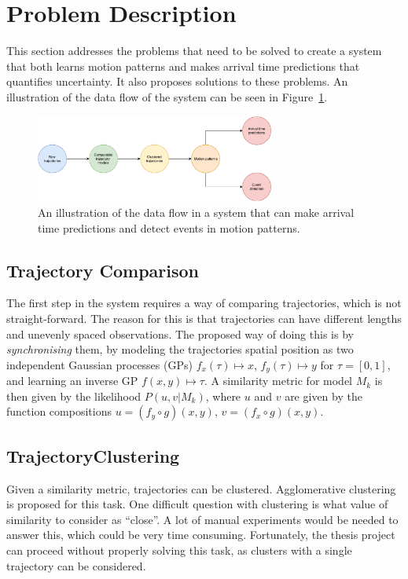\section{Problem Description}
This section addresses the problems that need to be solved to create a
system that both learns motion patterns and makes arrival
time predictions that quantifies uncertainty. It also proposes
solutions to these problems. An illustration of the data flow of the
system can be seen in Figure~\ref{fig:system-subproblems}.
\begin{figure}[H]
  \centering
  \includegraphics[width=0.7\textwidth]{figures/system-subproblems}
  \caption{An illustration of the data flow in a system that can make
    arrival time predictions and detect events in motion patterns.}\label{fig:system-subproblems}
\end{figure}

\subsection{Trajectory Comparison}
The first step in the system requires a way of comparing
trajectories, which is not straight-forward. The reason for this is that trajectories
can have different lengths and unevenly spaced observations.
The proposed way of doing this is by \textit{synchronising} them,
by modeling the trajectories spatial position as two independent
Gaussian processes (GPs) \(f_x(\tau) \mapsto
x\), \(f_y(\tau) \mapsto y\) for $\tau = [0,1]$, and learning an
inverse GP \(f(x, y) \mapsto \tau\). A similarity
metric for model \(M_k\) is then given by the likelihood \(P(u, v | M_k)\), where
$u$ and $v$ are given by the function compositions \(u = (f_{y} \circ g)(x, y)\),
\(v = (f_{x} \circ g)(x, y)\).


\subsection{TrajectoryClustering}
Given a similarity metric, trajectories can be
clustered. Agglomerative clustering is proposed for this task.
One difficult question with clustering is what value of similarity to consider
as ``close''. A lot of manual experiments would be needed to
answer this, which could be very time consuming. Fortunately, the thesis
project can proceed without properly solving this task, as clusters
with a single trajectory can be considered.

